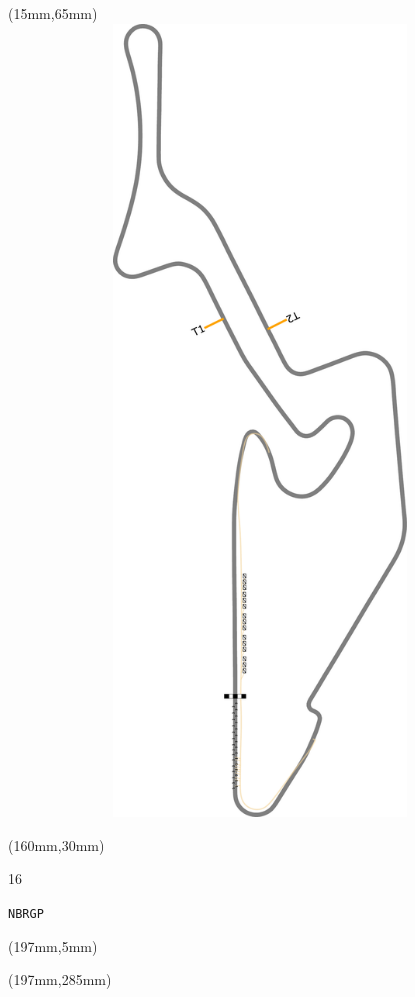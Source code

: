 \begin{textblock*}{185mm}(15mm,65mm)%
\centering
\mbox{\includegraphics[width=185mm,height=210mm,keepaspectratio]{PT/NBRGP.pdf}}
\end{textblock*}
\begin{textblock*}{40mm}(160mm,30mm)%
\Large
\par{} 
\par16 
\par\hfill\tiny\tt NBRGP\\
\end{textblock*}
\begin{textblock*}{20mm}(197mm,5mm)%
\fbox{\thepage}
\label{NBRGP}
\end{textblock*}
\begin{textblock*}{20mm}(197mm,285mm)%
\fbox{\thepage}
\end{textblock*}

